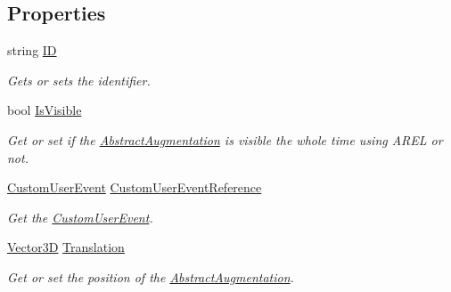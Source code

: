 \subsection*{Properties}
\begin{DoxyCompactItemize}
\item 
string \hyperlink{class_a_rdev_kit_1_1_model_1_1_project_1_1_abstract_augmentation_a3590cc30e6169c0946c70b52223eb2bf}{I\-D}
\begin{DoxyCompactList}\small\item\em Gets or sets the identifier. \end{DoxyCompactList}\item 
bool \hyperlink{class_a_rdev_kit_1_1_model_1_1_project_1_1_abstract_augmentation_ab19dda553062c0cae9e4a7a66e9cb64f}{Is\-Visible}
\begin{DoxyCompactList}\small\item\em Get or set if the \hyperlink{class_a_rdev_kit_1_1_model_1_1_project_1_1_abstract_augmentation}{Abstract\-Augmentation} is visible the whole time using A\-R\-E\-L or not. \end{DoxyCompactList}\item 
\hyperlink{class_a_rdev_kit_1_1_model_1_1_project_1_1_custom_user_event}{Custom\-User\-Event} \hyperlink{class_a_rdev_kit_1_1_model_1_1_project_1_1_abstract_augmentation_a333186e3963596bc5b17c02a21f2d384}{Custom\-User\-Event\-Reference}
\begin{DoxyCompactList}\small\item\em Get the \hyperlink{class_a_rdev_kit_1_1_model_1_1_project_1_1_custom_user_event}{Custom\-User\-Event}. \end{DoxyCompactList}\item 
\hyperlink{class_a_rdev_kit_1_1_model_1_1_project_1_1_vector3_d}{Vector3\-D} \hyperlink{class_a_rdev_kit_1_1_model_1_1_project_1_1_abstract_augmentation_a8ed7943a2eb75682addda8731bff6c34}{Translation}
\begin{DoxyCompactList}\small\item\em Get or set the position of the \hyperlink{class_a_rdev_kit_1_1_model_1_1_project_1_1_abstract_augmentation}{Abstract\-Augmentation}. \end{DoxyCompactList}\item 

\end{DoxyCompactItemize}
